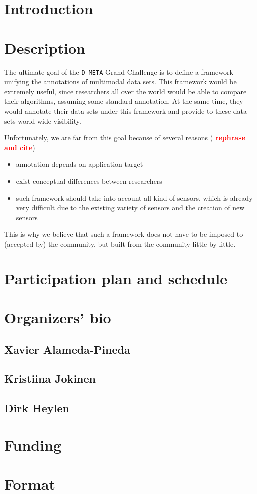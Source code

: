 \documentclass{sig-alternate}
\newcommand{\todo}[1]{ \textcolor{red}{\bf #1}}
\begin{document}
\section{Introduction}

\section{Description}
The ultimate goal of the \texttt{D-META} Grand Challenge is to define a framework unifying the annotations of multimodal
data sets. This framework would be extremely useful, since researchers all over the world would be able
to compare their algorithms, assuming some standard annotation. At the same time, they would annotate their data sets
under this framework and provide to these data sets world-wide visibility.

Unfortunately, we are far from this goal because of several reasons (\todo{rephrase and cite})
\begin{itemize}
 \item annotation depends on application target
 \item exist conceptual differences between researchers
 \item such framework should take into account all kind of sensors, which is already very difficult due to the existing
variety of sensors and the creation of new sensors
\end{itemize}

This is why we believe that such a framework does not have to be imposed to (accepted by) the community, but built from
the community little by little.


\section{Participation plan and schedule}

\section{Organizers' bio}
\subsection{Xavier Alameda-Pineda}
\subsection{Kristiina Jokinen}
\subsection{Dirk Heylen}

\section{Funding}

\section{Format}
\end{document}

